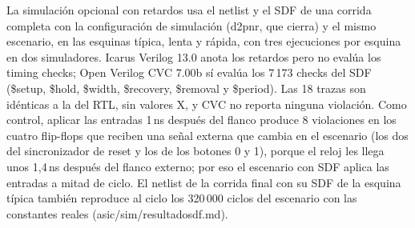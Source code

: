 \documentclass[11pt,a4paper]{article}
\DeclareRobustCommand{\sig}[1]{{\ttfamily\def\_{\textunderscore\allowbreak}#1}}
\begin{document}
La simulación opcional con retardos usa el netlist y el SDF de una corrida completa con la configuración de simulación (\sig{d2\_pnr}, que cierra) y el mismo escenario, en las esquinas típica, lenta y rápida, con tres ejecuciones por esquina en dos simuladores. Icarus Verilog 13.0 anota los retardos pero no evalúa los timing checks; Open Verilog CVC 7.00b sí evalúa los 7\,173 checks del SDF (\sig{\$setup}, \sig{\$hold}, \sig{\$width}, \sig{\$recovery}, \sig{\$removal} y \sig{\$period}). Las 18 trazas son idénticas a la del RTL, sin valores X, y CVC no reporta ninguna violación. Como control, aplicar las entradas 1\,ns después del flanco produce 8 violaciones en los cuatro flip-flops que reciben una señal externa que cambia en el escenario (los dos del sincronizador de reset y los de los botones 0 y 1), porque el reloj les llega unos 1,4\,ns después del flanco externo; por eso el escenario con SDF aplica las entradas a mitad de ciclo. El netlist de la corrida final con su SDF de la esquina típica también reproduce al ciclo los 320\,000 ciclos del escenario con las constantes reales (\sig{asic/sim/resultado\_sdf.md}).
\end{document}
